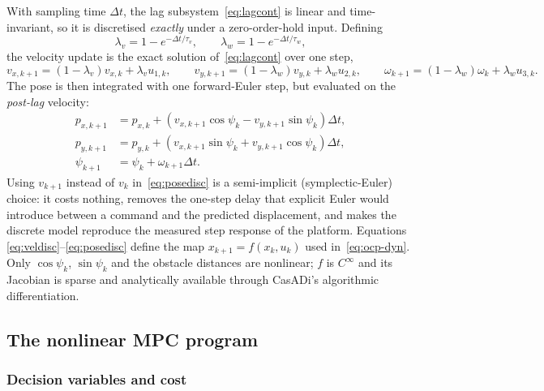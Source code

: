\documentclass[11pt,a4paper]{article}
\begin{document}
With sampling time $\Delta t$, the lag subsystem~\eqref{eq:lagcont} is linear and time-invariant, so it is
discretised \emph{exactly} under a zero-order-hold input. Defining
\begin{equation}
  \lambda_v = 1-e^{-\Delta t/\tau_v},\qquad \lambda_w = 1-e^{-\Delta t/\tau_w},
  \label{eq:lags}
\end{equation}
the velocity update is the exact solution of~\eqref{eq:lagcont} over one step,
\begin{equation}
  v_{x,k+1}=(1-\lambda_v)v_{x,k}+\lambda_v u_{1,k},\qquad
  v_{y,k+1}=(1-\lambda_w)v_{y,k}+\lambda_w u_{2,k},\qquad
  \omega_{k+1}=(1-\lambda_w)\omega_{k}+\lambda_w u_{3,k}.
  \label{eq:veldisc}
\end{equation}
The pose is then integrated with one forward-Euler step, but evaluated on the \emph{post-lag} velocity:
\begin{equation}
  \begin{aligned}
    p_{x,k+1} &= p_{x,k} + \left(v_{x,k+1}\cos\psi_k - v_{y,k+1}\sin\psi_k\right)\Delta t,\\
    p_{y,k+1} &= p_{y,k} + \left(v_{x,k+1}\sin\psi_k + v_{y,k+1}\cos\psi_k\right)\Delta t,\\
    \psi_{k+1} &= \psi_k + \omega_{k+1}\Delta t .
  \end{aligned}
  \label{eq:posedisc}
\end{equation}
Using $v_{k+1}$ instead of $v_k$ in~\eqref{eq:posedisc} is a semi-implicit (symplectic-Euler) choice: it costs
nothing, removes the one-step delay that explicit Euler would introduce between a command and the predicted
displacement, and makes the discrete model reproduce the measured step response of the platform. Equations
\eqref{eq:veldisc}--\eqref{eq:posedisc} define the map $x_{k+1}=f(x_k,u_k)$ used in~\eqref{eq:ocp-dyn}. Only
$\cos\psi_k$, $\sin\psi_k$ and the obstacle distances are nonlinear; $f$ is $C^\infty$ and its Jacobian is
sparse and analytically available through CasADi's algorithmic differentiation.

\subsection{The nonlinear MPC program}
\label{sec:nlp}

\subsubsection{Decision variables and cost}
\label{sec:cost}
\end{document}
